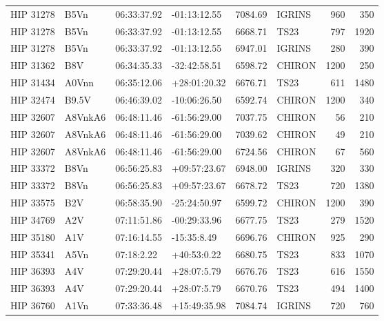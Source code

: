 \documentclass{emulateapj}
\begin{document}
\begin{longtable*}{|l|lllrlrr|}
   HIP 31278 &           B5Vn &    06:33:37.92 &   -01:13:12.55 &  7084.69 &     IGRINS &      960 &     350 \\
   HIP 31278 &           B5Vn &    06:33:37.92 &   -01:13:12.55 &  6668.71 &       TS23 &      797 &    1920 \\
   HIP 31278 &           B5Vn &    06:33:37.92 &   -01:13:12.55 &  6947.01 &     IGRINS &      280 &     390 \\
   HIP 31362 &            B8V &    06:34:35.33 &   -32:42:58.51 &  6598.72 &     CHIRON &     1200 &     250 \\
   HIP 31434 &          A0Vnn &    06:35:12.06 &   +28:01:20.32 &  6676.71 &       TS23 &      611 &    1480 \\
   HIP 32474 &          B9.5V &    06:46:39.02 &   -10:06:26.50 &  6592.74 &     CHIRON &     1200 &     340 \\
   HIP 32607 &        A8VnkA6 &    06:48:11.46 &   -61:56:29.00 &  7037.75 &     CHIRON &       56 &     210 \\
   HIP 32607 &        A8VnkA6 &    06:48:11.46 &   -61:56:29.00 &  7039.62 &     CHIRON &       49 &     210 \\
   HIP 32607 &        A8VnkA6 &    06:48:11.46 &   -61:56:29.00 &  6724.56 &     CHIRON &       67 &     560 \\
   HIP 33372 &           B8Vn &    06:56:25.83 &   +09:57:23.67 &  6948.00 &     IGRINS &      320 &     330 \\
   HIP 33372 &           B8Vn &    06:56:25.83 &   +09:57:23.67 &  6678.72 &       TS23 &      720 &    1380 \\
   HIP 33575 &            B2V &    06:58:35.90 &   -25:24:50.97 &  6599.72 &     CHIRON &     1200 &     390 \\
   HIP 34769 &            A2V &    07:11:51.86 &   -00:29:33.96 &  6677.75 &       TS23 &      279 &    1520 \\
   HIP 35180 &            A1V &    07:16:14.55 &    -15:35:8.49 &  6696.76 &     CHIRON &      925 &     290 \\
   HIP 35341 &           A5Vn &     07:18:2.22 &    +40:53:0.22 &  6680.75 &       TS23 &      833 &    1070 \\
   HIP 36393 &            A4V &    07:29:20.44 &    +28:07:5.79 &  6676.76 &       TS23 &      616 &    1550 \\
   HIP 36393 &            A4V &    07:29:20.44 &    +28:07:5.79 &  6670.76 &       TS23 &      494 &    1400 \\
   HIP 36760 &           A1Vn &    07:33:36.48 &   +15:49:35.98 &  7084.74 &     IGRINS &      720 &     760 \\

\end{longtable*}
\end{document}
